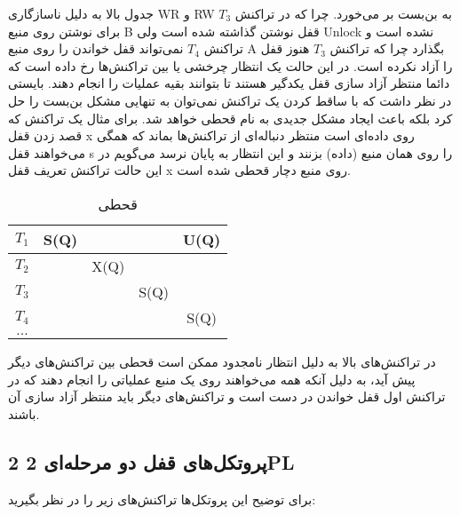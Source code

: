 \documentclass[a4paper]{article}
\begin{document}
جدول بالا به دلیل ناسازگاری WR و RW به بن‌بست بر می‌خورد. چرا که در تراکنش
$T_{3}$ برای نوشتن روی منبع B قفل نوشتن گذاشته شده است ولی Unlock نشده است و
تراکنش $T_{4}$ نمی‌تواند قفل خواندن را روی منبع A بگذارد چرا که تراکنش $T_{3}$
هنوز قفل را آزاد نکرده است. در این حالت یک انتظار چرخشی یا 
بین تراکنش‌ها رخ داده است که دائما منتظر آزاد سازی قفل یکدگیر هستند تا بتوانند
بقیه عملیات را انجام دهند. بایستی در نظر داشت که با ساقط کردن یک تراکنش نمی‌توان
به تنهایی مشکل بن‌بست را حل کرد بلکه باعث ایجاد مشکل جدیدی به نام قحطی خواهد شد.
برای مثال یک تراکنش که قصد زدن قفل x روی داده‌ای است منتظر دنباله‌ای از
تراکنش‌ها بماند که همگی می‌خواهند قفل s را روی همان منبع (داده) بزنند و این
انتظار به پایان نرسد می‌گویم در این حالت تراکنش تعریف قفل x روی منبع دچار قحطی
شده است.

\begin{LTR}
    \begin{table}[h]
        \begin{RTL}
            \caption{قحطی}
        \end{RTL}
        \centering
            \begin{tabular}{c|c|c|c|c}
                $T_{1}$ & S(Q) & & & U(Q) \\ \hline
                $T_{2}$ & & X(Q) & & \\ \hline
                $T_{3}$ & & & S(Q) & \\ \hline
                $T_{4}$ & & & & S(Q) \\ \hline
                $...$ & & & & \\ 
            \end{tabular}
    \end{table}
\end{LTR}

در تراکنش‌های بالا به دلیل انتظار نامجدود ممکن است قحطی بین تراکنش‌های دیگر پیش
آید، به دلیل آنکه همه می‌خواهند روی یک منبع عملیاتی را انجام دهند که در تراکنش
اول قفل خواندن در دست است و تراکنش‌های دیگر باید منتظر آزاد سازی آن باشند.

\newpage

\subsection{پروتکل‌های قفل دو مرحله‌ای 2 2PL}

برای توضیح این پروتکل‌ها تراکنش‌های زیر را در نظر بگیرید:
\end{document}
